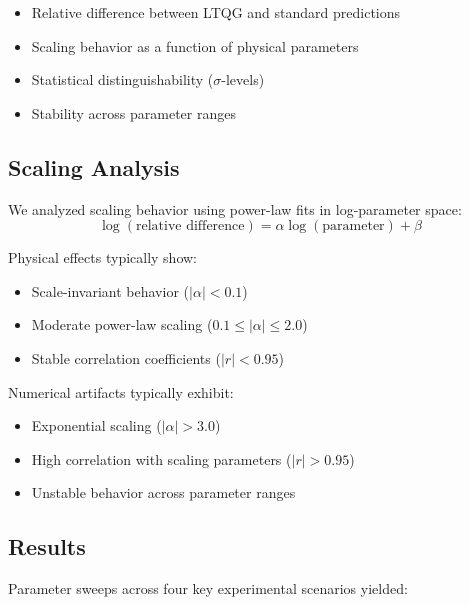 \documentclass[12pt,a4paper]{article}
\begin{document}
\begin{itemize}
\item Relative difference between LTQG and standard predictions
\item Scaling behavior as a function of physical parameters
\item Statistical distinguishability ($\sigma$-levels)
\item Stability across parameter ranges
\end{itemize}

\subsection{Scaling Analysis}

We analyzed scaling behavior using power-law fits in log-parameter space:
\begin{equation}
\log(\text{relative difference}) = \alpha \log(\text{parameter}) + \beta
\end{equation}

Physical effects typically show:
\begin{itemize}
\item Scale-invariant behavior ($|\alpha| < 0.1$)
\item Moderate power-law scaling ($0.1 \leq |\alpha| \leq 2.0$)
\item Stable correlation coefficients ($|r| < 0.95$)
\end{itemize}

Numerical artifacts typically exhibit:
\begin{itemize}
\item Exponential scaling ($|\alpha| > 3.0$)
\item High correlation with scaling parameters ($|r| > 0.95$)
\item Unstable behavior across parameter ranges
\end{itemize}

\subsection{Results}

Parameter sweeps across four key experimental scenarios yielded:
\end{document}
